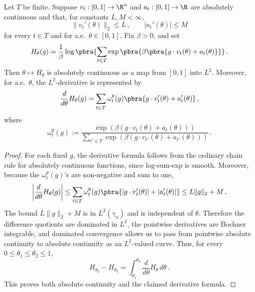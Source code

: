 \documentclass[11pt]{article}
\begin{document}
\begin{lemma}
\label{lem:l2-chain}
	Let $T$ be finite.
	Suppose $v_t:[0,1]\to\R^n$ and $a_t:[0,1]\to\R$ are absolutely continuous and that, for constants $L,M<\infty$,
	\[
		\|v_t'(\theta)\|_2\leq  L\,,
		\qquad
		|a_t'(\theta)|\leq  M
	\]
	for every $t\in T$ and for a.e.~$\theta\in[0,1]$.
	Fix $\beta>0$, and set
	\[
		H_\theta(g)
		=
		\frac{1}{\beta}
		\log\pbra{
		\sum_{t\in T}
		\exp\pbra{\beta\pbra{g\cdot v_t(\theta)+a_t(\theta)}}
		}\,.
	\]
	Then $\theta\mapsto H_\theta$ is absolutely continuous as a map from $[0,1]$ into $L^2$.
	Moreover, for a.e.~$\theta$, the $L^2$-derivative is represented by
	\[
		\frac{d}{d\theta}H_\theta(g)
		=
		\sum_{t\in T}
		\omega_t^\theta(g)
		\pbra{
		g\cdot v_t'(\theta)
		+
		a_t'(\theta)
		}\,,
	\]
	where
	\[
		\omega_t^\theta(g)
		:=
		\frac{
		\exp\left(\beta(g\cdot v_t(\theta)+a_t(\theta))\right)
		}{
		\sum_{t'\in T}
		\exp\left(\beta(g\cdot v_{t'}(\theta)+a_{t'}(\theta))\right)
		}\,.
	\]
\end{lemma}

\begin{proof}
	For each fixed $g$, the derivative formula follows from the ordinary chain rule for absolutely continuous functions, since log-sum-exp is smooth.
	Moreover, because the $\omega_t^\theta(g)$'s are non-negative and sum to one,
	\[
		\left|
		\frac{d}{d\theta}H_\theta(g)
		\right|
		\leq 
		\sum_{t\in T}
		\omega_t^\theta(g)
		\pbra{|g\cdot v_t'(\theta)|+|a_t'(\theta)|}
		\leq 
		L\|g\|_2+M\,.
	\]
	The bound $L\|g\|_2+M$ is in $L^2(\gamma_n)$ and is independent of $\theta$. 
	Therefore the difference quotients are dominated in $L^2$, the pointwise derivatives are Bochner integrable, and dominated convergence allows us to pass from pointwise absolute continuity to absolute continuity as an $L^2$-valued curve. 
	Thus, for every $0\leq \theta_1\leq \theta_2\leq 1$,
	\[
		H_{\theta_2}-H_{\theta_1}
		=
		\int_{\theta_1}^{\theta_2}
		\frac{d}{d\theta}H_\theta\,d\theta\,.
	\]
	This proves both absolute continuity and the claimed derivative formula. 
\end{proof}
\end{document}
